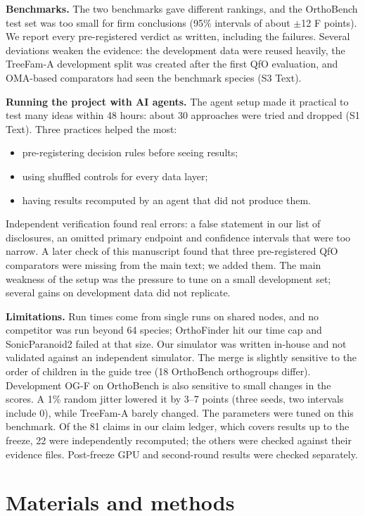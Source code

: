 \documentclass[10pt,letterpaper]{article}
\begin{document}
\textbf{Benchmarks.} The two benchmarks gave different rankings, and the OrthoBench test set was too small for firm conclusions (95\% intervals of about $\pm$12 F points). We report every pre-registered verdict as written, including the failures. Several deviations weaken the evidence: the development data were reused heavily, the TreeFam-A development split was created after the first QfO evaluation, and OMA-based comparators had seen the benchmark species (S3 Text).

\textbf{Running the project with AI agents.} The agent setup made it practical to test many ideas within 48 hours: about 30 approaches were tried and dropped (S1 Text). Three practices helped the most:
\begin{itemize}
\item pre-registering decision rules before seeing results;
\item using shuffled controls for every data layer;
\item having results recomputed by an agent that did not produce them.
\end{itemize}
Independent verification found real errors: a false statement in our list of disclosures, an omitted primary endpoint and confidence intervals that were too narrow. A later check of this manuscript found that three pre-registered QfO comparators were missing from the main text; we added them. The main weakness of the setup was the pressure to tune on a small development set; several gains on development data did not replicate.

\textbf{Limitations.} Run times come from single runs on shared nodes, and no competitor was run beyond 64 species; OrthoFinder hit our time cap and SonicParanoid2 failed at that size. Our simulator was written in-house and not validated against an independent simulator. The merge is slightly sensitive to the order of children in the guide tree (18 OrthoBench orthogroups differ). Development OG-F on OrthoBench is also sensitive to small changes in the scores. A 1\% random jitter lowered it by 3--7 points (three seeds, two intervals include 0), while TreeFam-A barely changed. The parameters were tuned on this benchmark. Of the 81 claims in our claim ledger, which covers results up to the freeze, 22 were independently recomputed; the others were checked against their evidence files. Post-freeze GPU and second-round results were checked separately.

\section*{Materials and methods}
\end{document}
